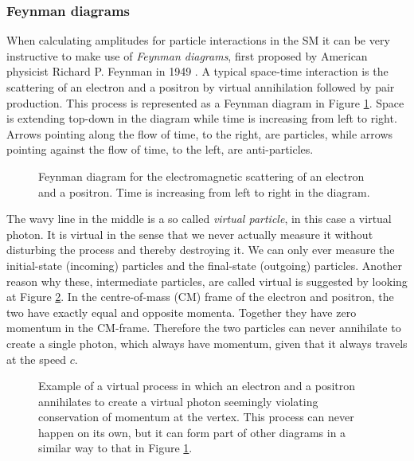 \subsubsection{Feynman diagrams}
When calculating amplitudes for particle interactions in the SM it can be very instructive to make use of \emph{Feynman diagrams}, first proposed by American physicist Richard P. Feynman in 1949 \cite{feynman1949sta}. A typical space-time interaction is the scattering of an electron and a positron by virtual annihilation followed by pair production. This process is represented as a Feynman diagram in Figure \ref{fig:feyn:ee_a_ee}. Space is extending top-down in the diagram while time is increasing from left to right. Arrows pointing along the flow of time, to the right, are particles, while arrows pointing against the flow of time, to the left, are anti-particles.

\begin{figure}[htp]
\centering
	
\caption{Feynman diagram for the electromagnetic scattering of an electron and a positron. Time is increasing from left to right in the diagram.} \label{fig:feyn:ee_a_ee}
\end{figure}

The wavy line in the middle is a so called \emph{virtual particle}, in this case a virtual photon. It is virtual in the sense that we never actually measure it without disturbing the process and thereby destroying it. We can only ever measure the initial-state (incoming) particles and the final-state (outgoing) particles. Another reason why these, intermediate particles, are called virtual is suggested by looking at Figure \ref{fig:feyn:ee_a}. In the centre-of-mass (CM) frame of the electron and positron, the two have exactly equal and opposite momenta. Together they have zero momentum in the CM-frame. Therefore the two particles can never annihilate to create a single photon, which always have momentum, given that it always travels at the speed $c$. \cite{griffiths1987iep}

\begin{figure}[htp]
\centering
	
\caption{Example of a virtual process in which an electron and a positron annihilates to create a virtual photon seemingly violating conservation of momentum at the vertex. This process can never happen on its own, but it can form part of other diagrams in a similar way to that in Figure \ref{fig:feyn:ee_a_ee}.} \label{fig:feyn:ee_a}
\end{figure}

